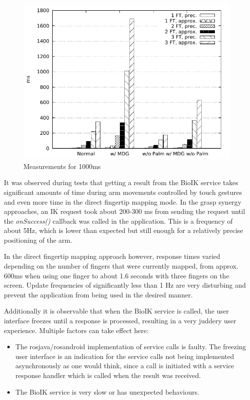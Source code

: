 \begin{figure}
	\caption{\label{fig:eval:1000ms}Measurements for 1000ms}
	\begin{center}
		\includegraphics{assets/chpt_eval/1000ms.pdf}
	\end{center}
\end{figure}


It was observed during tests that getting a result from the BioIK service takes significant amounts of time during arm movements controlled by touch gestures and even more time in the direct fingertip mapping mode. In the grasp synergy approaches, an IK request took about 200-300 ms from sending the request until the \textit{onSuccess()} callback was called in the application. This is a frequency of about 5Hz, which is lower than expected but still enough for a relatively precise positioning of the arm.

In the direct fingertip mapping approach however, response times varied depending on the number of fingers that were currently mapped, from approx. 600ms when using one finger to about 1.6 seconds with three fingers on the screen. Update frequencies of significantly less than 1 Hz are very disturbing and prevent the application from being used in the desired manner.

Additionally it is observable that when the BioIK service is called, the user interface freezes until a response is processed, resulting in a very juddery user experience. Multiple factors can take effect here:
\begin{itemize}
	\item The rosjava/rosandroid implementation of service calls is faulty. The freezing user interface is an indication for the service calls not being implemented asynchronously as one would think, since a call is initiated with a service response handler which is called when the result was received.
	\item The BioIK service is very slow or has unexpected behaviours.
\end{itemize}

